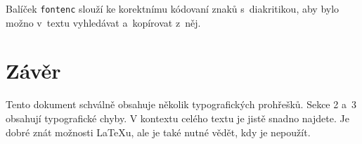 \documentclass[hidelinks, 10pt, twocolumn]{article}
\begin{document}

Balíček \verb|fontenc| slouží ke korektnímu kódovaní znaků s~diakritikou, aby bylo možno v~textu vyhledávat a~kopírovat z~něj.

\section{Závěr}

Tento dokument schválně obsahuje několik typografických prohřešků.
Sekce 2 a~3 obsahují typografické chyby.
V kontextu celého textu je jistě snadno najdete.
Je dobré znát možnosti \LaTeX{}u, ale je také nutné vědět, kdy je nepoužít.


    
\end{document}
